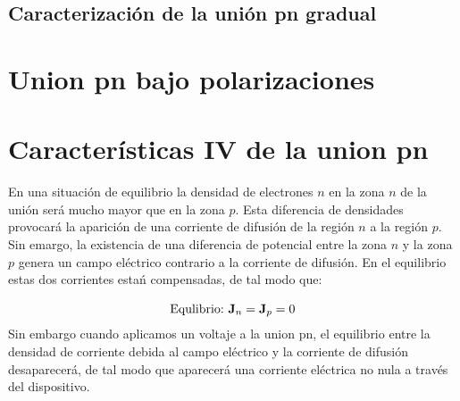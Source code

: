 \subsection{Caracterización de la unión pn gradual}


\section{Union pn bajo polarizaciones}


\section{Características IV de la union pn}

En una situación de equilibrio la densidad de electrones $n$ en la zona $n$ de la unión será mucho mayor que en la zona $p$. Esta diferencia de densidades provocará la aparición de una corriente de difusión de la región $n$ a la región $p$. Sin emargo, la existencia de una diferencia de potencial entre la zona $n$ y la zona $p$ genera un campo eléctrico contrario a la corriente de difusión. En el equilibrio estas dos corrientes estań compensadas, de tal modo que:

\begin{equation}
    \text{Equlibrio:} \ \mathbf{J}_n = \mathbf{J}_p = 0
\end{equation}
Sin embargo cuando aplicamos un voltaje a la union pn, el equilibrio entre la densidad de corriente debida al campo eléctrico y la corriente de difusión desaparecerá, de tal modo que aparecerá una corriente eléctrica no nula a través del dispositivo. 

